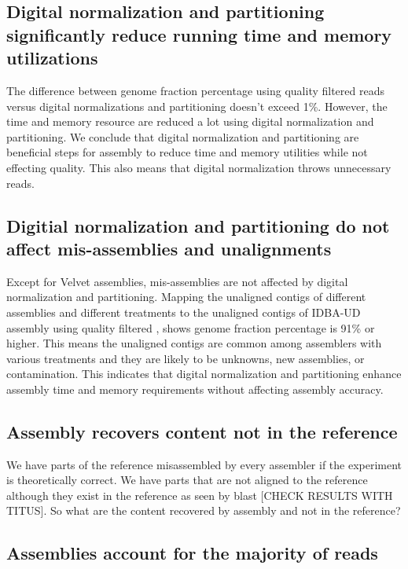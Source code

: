  \subsection*{Digital normalization and partitioning significantly reduce running time and memory utilizations}
 
The difference between genome fraction percentage using quality filtered reads versus digital normalizations and partitioning doesn't exceed 1\%. However, the time and memory resource are reduced a lot using digital normalization and partitioning. We conclude that digital normalization and partitioning are beneficial steps for assembly to reduce time and memory utilities while not effecting quality.  This also means that digital normalization throws unnecessary reads.
 
 \subsection*{Digitial normalization and partitioning do not  affect mis-assemblies and unalignments}
 
Except for Velvet assemblies, mis-assemblies are not affected by digital normalization and partitioning. 
Mapping the unaligned  contigs of different assemblies and different treatments to the unaligned contigs of  IDBA-UD  assembly using quality filtered , shows genome fraction percentage is 91\% or higher. This means the unaligned contigs are common among assemblers with various treatments and they are likely to be unknowns, new assemblies, or contamination. This indicates that digital normalization and partitioning enhance assembly time and memory requirements without affecting assembly accuracy.  

\subsection*{Assembly recovers content not in the reference } 
We have parts of the reference misassembled by every assembler if the experiment is theoretically correct. 
We have parts that are not aligned to the reference although they exist in the reference as seen by blast [CHECK RESULTS WITH TITUS]. 
So what are the content recovered by assembly and not in the reference?

\subsection*{Assemblies account for the majority of reads}
  
